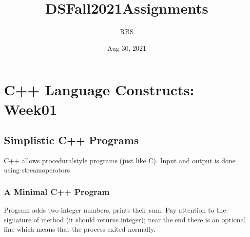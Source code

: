 \documentclass[letterpaper,10pt,english,openany,oneside]{sphinxmanual}
\title{DS\sphinxhyphen{}Fall2021\sphinxhyphen{}Assignments}
\date{Aug 30, 2021}
\author{RBS}
\begin{document}
\pagestyle{empty}

\pagestyle{plain}

\pagestyle{normal}
\label{\detokenize{index::doc}}



\chapter{C++ Language Constructs: Week01}
\label{\detokenize{constructs-week01:c-language-constructs-week01}}\label{\detokenize{constructs-week01::doc}}

\section{Simplistic C++ Programs}
\label{\detokenize{constructs-week01:simplistic-c-programs}}
\sphinxAtStartPar
C++ allows procedural\sphinxhyphen{}style programs (just like C).
Input and output is done using stream\sphinxhyphen{}operators


\subsection{A Minimal C++ Program}
\label{\detokenize{constructs-week01:a-minimal-c-program}}
\sphinxAtStartPar
Program  adds two integer numbers, prints their sum.
Pay attention to the signature of  method (it should returns integer);
near the end there is an optional line  which means that
the process exited normally.

%
\begin{sphinxVerbatim}[commandchars=\\\{\}]
 

  
 
        
          
        
                  
     
\end{sphinxVerbatim}
\sphinxresetverbatimhllines
\end{document}
